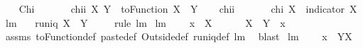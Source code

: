 \begin{isabellebody}
\ \ \isamarkupfalse%
\ Chi\ {\isacharparenleft}\ {\isachardoublequoteopen}{\isacharless}{\isacharbar}{\isacharbar}{\isachardoublequoteclose}\ {}{}{\isacharparenright}\isanewline
\isanewline
{}\isamarkupfalse%
\ \isanewline
\ \ {\isachardoublequoteopen}chii\ X\ Y\ {\isacharequal}{\isacharequal}\ toFunction\ {\isacharparenleft}X\ {\isacharless}{\isacharbar}{\isacharbar}\ Y{\isacharparenright}{\isachardoublequoteclose}\isanewline
\ \ \isamarkupfalse%
\ chii\ {\isacharparenleft}\ {\isachardoublequoteopen}{\isacharless}{\isacharbar}{\isachardoublequoteclose}\ {}{}{\isacharparenright}\isanewline
\isanewline
\isanewline
{}\isamarkupfalse%
\ \isanewline
\ \ {\isachardoublequoteopen}chi\ X\ {\isacharequal}{\isacharequal}\ indicator\ X{\isachardoublequoteclose}\isanewline
\isanewline
{}\isamarkupfalse%
\ lm{}{}{}{\isacharcolon}\ \isanewline
\ \ {\isachardoublequoteopen}runiq\ {\isacharparenleft}X\ {\isacharless}{\isacharbar}{\isacharbar}\ Y{\isacharparenright}{\isachardoublequoteclose}\ \isanewline
%
\isadelimproof
\ \ %
\endisadelimproof
%
\isatagproof
{}\isamarkupfalse%
\ {\isacharparenleft}rule\ lm{}{}{}{\isacharparenright}%
\endisatagproof
{\isafoldproof}%
%
\isadelimproof
\isanewline
%
\endisadelimproof
\isanewline
{}\isamarkupfalse%
\ lm{}{}{}{\isacharcolon}\ \isanewline
\ \ \ {\isachardoublequoteopen}x\ {\isasymin}\ X{\isachardoublequoteclose}\ \isanewline
\ \ \ {\isachardoublequoteopen}{}\ {\isasymin}\ {\isacharparenleft}X\ {\isacharless}{\isacharbar}{\isacharbar}\ Y{\isacharparenright}\ {\isacharbackquote}{\isacharbackquote}\ {\isacharbraceleft}x{\isacharbraceright}{\isachardoublequoteclose}\ \isanewline
%
\isadelimproof
\ \ %
\endisadelimproof
%
\isatagproof
{}\isamarkupfalse%
\ assms\ toFunction{\isacharunderscore}def\ paste{\isacharunderscore}def\ Outside{\isacharunderscore}def\ runiq{\isacharunderscore}def\ lm{}{}{}\ \isamarkupfalse%
\ blast%
\endisatagproof
{\isafoldproof}%
%
\isadelimproof
\isanewline
%
\endisadelimproof
\isanewline
{}\isamarkupfalse%
\ lm{}{}{}{\isacharcolon}\ \isanewline
\ \ \ {\isachardoublequoteopen}x\ {\isasymin}\ Y{\isacharminus}X{\isachardoublequoteclose}\ \isanewline

\end{isabellebody}
